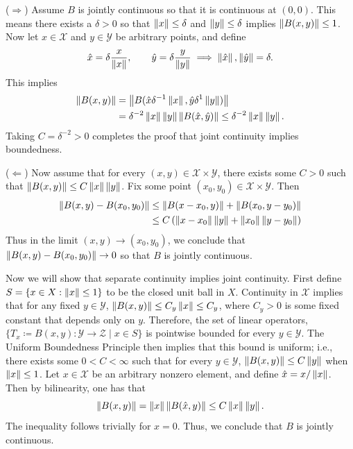 \documentclass{article}
\begin{document}
	($\Longrightarrow$) Assume $B$ is jointly continuous so that it is continuous at $(0,0)$. This means there exists a $\delta > 0$ so that $\left\Vert x \right\Vert \leq \delta$ and $\left\Vert y \right\Vert \leq \delta$ implies $\left\Vert B(x,y) \right\Vert \leq 1$. Now let $x \in \mathscr{X}$ and $y\in \mathscr{Y}$ be arbitrary points, and define 
	\begin{equation*}
		\hat{x} = \delta \frac{x}{\left\Vert x \right\Vert}, \qquad \hat{y} = \delta \frac{y}{\left\Vert y \right\Vert} \implies \left\Vert \hat{x} \right\Vert, \left\Vert \hat{y} \right\Vert = \delta.  
	\end{equation*}
	This implies 
	\begin{align*}
		\begin{split}
			\left\Vert B(x, y) \right\Vert &= \left\Vert B(\hat{x}\delta^{-1}\left\Vert x \right\Vert, \hat{y}\delta^{1}\left\Vert y \right\Vert) \right\Vert \\
			&= \delta^{-2}\left\Vert x \right\Vert\left\Vert y \right\Vert\left\Vert B(\hat{x}, \hat{y}) \right\Vert \leq \delta^{-2}\left\Vert x \right\Vert\left\Vert y \right\Vert. 
		\end{split}
	\end{align*}
	Taking $C = \delta^{-2} >0$ completes the proof that joint continuity implies boundedness. 
	
	($\Longleftarrow$) Now assume that for every $(x, y) \in \mathscr{X} \times \mathscr{Y}$, there exists some $C > 0$ such that $\left\Vert B(x, y) \right\Vert \leq C\left\Vert x \right\Vert\left\Vert y \right\Vert$. Fix some point $(x_{0}, y_{0}) \in \mathscr{X} \times \mathscr{Y}$. Then 
	\begin{align*}
		\begin{split}
			\left\Vert B(x, y) - B(x_{0}, y_{0}) \right\Vert &\leq \left\Vert B(x - x_{0}, y) \right\Vert + \left\Vert B(x_{0}, y- y_{0}) \right\Vert \\
			&\leq C\left(\left\Vert x - x_{0} \right\Vert\left\Vert y \right\Vert + \left\Vert x_{0} \right\Vert\left\Vert y- y_{0} \right\Vert\right)
		\end{split}
	\end{align*}
	Thus in the limit $(x, y) \to (x_{0}, y_{0})$, we conclude that $\left\Vert B(x, y) - B(x_{0}, y_{0}) \right\Vert \to 0$ so that $B$ is jointly continuous. 
	
	Now we will show that separate continuity implies joint continuity. First define $S = \{x \in X: \left\Vert x \right\Vert \leq 1\}$ to be the closed unit ball in $X$. Continuity in $\mathscr{X}$ implies that for any fixed $y \in \mathscr{Y}$, $\left\Vert B(x, y) \right\Vert \leq C_{y} \left\Vert x \right\Vert \leq C_{y}$, where $C_{y} > 0$ is some fixed constant that depends only on $y$. Therefore, the set of linear operators, $\{T_{x} \coloneqq B(x, y): \mathscr{Y} \to \mathscr{Z} \mid x \in S\}$ is pointwise bounded for every $y\in \mathscr{Y}$. The Uniform Boundedness Principle then implies that this bound is uniform; i.e., there exists some $0 < C < \infty$ such that for every $y \in \mathscr{Y}$, $\left\Vert B(x, y) \right\Vert \leq C\left\Vert y \right\Vert$ when $\left\Vert x \right\Vert \leq 1$. Let $x \in \mathscr{X}$ be an arbitrary nonzero element, and define $\hat{x} = x/\left\Vert x \right\Vert$. Then by bilinearity, one has that 
	\begin{equation*}
		\left\Vert B(x,y) \right\Vert = \left\Vert x \right\Vert\left\Vert B(\hat{x}, y) \right\Vert \leq C\left\Vert x \right\Vert\left\Vert y \right\Vert. 
	\end{equation*}
	The inequality follows trivially for $x = 0$. Thus, we conclude that $B$ is jointly continuous. 
\end{document}
